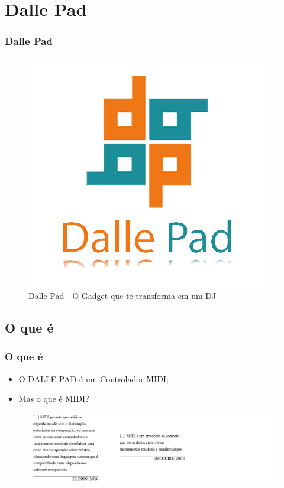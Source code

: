 \documentclass[hyperref={pdfpagelabels=false}]{beamer}
\begin{document}
    \section{Dalle Pad}

        \begin{frame}\frametitle{Dalle Pad}

            \begin{figure}
                    \includegraphics[scale=0.35]{Imagens/Logo01.png}
                    \caption{Dalle Pad - O Gadget que te transforma em um DJ}
            \end{figure}

        \end{frame}

        \subsection{O que é}

             \begin{frame}\frametitle{O que é}

                \begin{itemize}
                    \item O DALLE PAD é um Controlador MIDI;
                    \item Mas o que é MIDI?
                \end{itemize}

                \begin{figure}
                    \includegraphics[scale=0.5]{Imagens/Ideia_de_projeto/epigraphs.png}
                \end{figure}

            \end{frame}
\end{document}
